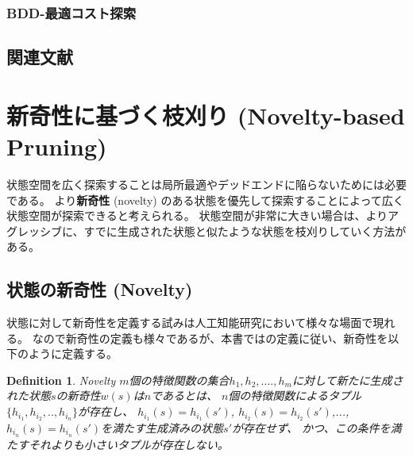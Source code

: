 \documentclass[10pt]{book}
\newtheorem{definition}{Definition}
\newcommand{\define}[2]{{\bf #1} (#2) \index{#1}\index{#2}}
\begin{document}
\subsubsection{BDD-最適コスト探索}



\subsection{関連文献}



\section{新奇性に基づく枝刈り (Novelty-based Pruning)}
\label{sec:novelty-based-pruning}

状態空間を広く探索することは局所最適やデッドエンドに陥らないためには必要である。
より\define{新奇性}{novelty}のある状態を優先して探索することによって広く状態空間が探索できると考えられる。
状態空間が非常に大きい場合は、よりアグレッシブに、すでに生成された状態と似たような状態を枝刈りしていく方法がある。




\subsection{状態の新奇性 (Novelty)}
\label{sec:novelty}

状態に対して新奇性を定義する試みは人工知能研究において様々な場面で現れる\cite{TODO}。
なので新奇性の定義も様々であるが、本書では\cite{geffner2015}の定義に従い、新奇性を以下のように定義する。


\begin{definition}{Novelty}
$m$個の特徴関数の集合$h_1,h_2,....,h_m$に対して新たに生成された状態$s$の新奇性$w(s)$は$n$であるとは、
$n$個の特徴関数によるタプル$\{h_{i_1},h_{i_2},..,h_{i_n}\}$が存在し、
$h_{i_1}(s) = h_{i_1}(s')$, $h_{i_2}(s) = h_{i_2}(s')$,...,$h_{i_n}(s) = h_{i_n}(s')$を満たす生成済みの状態$s'$が存在せず、
かつ、この条件を満たすそれよりも小さいタプルが存在しない。
\end{definition}
\end{document}
